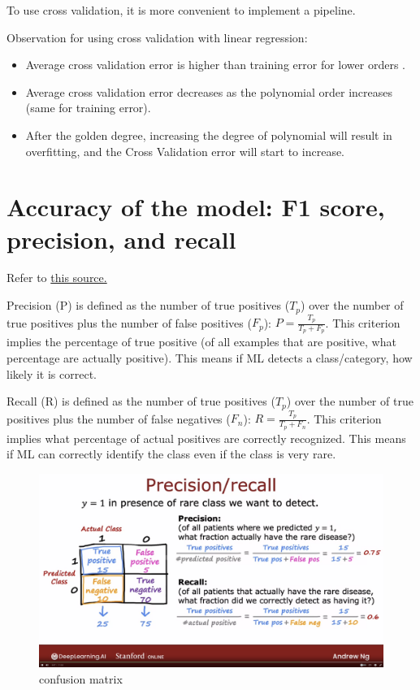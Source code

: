 \documentclass[12pt]{report}
\begin{document}
To use cross validation, it is more convenient to implement a pipeline.

Observation for using cross validation with linear regression:
\begin{itemize}
  \item Average cross validation error is higher than training error for lower orders .
  \item Average cross validation error decreases as the polynomial order increases (same for training error).
  \item After the golden degree, increasing the degree of polynomial will result in overfitting, and the Cross Validation error will start to increase.
\end{itemize}

\section{Accuracy of the model: F1 score, precision, and recall}
Refer to \href{https://scikit-learn.org/stable/auto_examples/model_selection/plot_precision_recall.html#precision-recall}{this source.}

Precision (P) is defined as the number of true positives ($T_p$) over the number of true positives plus the number of false positives ($F_p$): $P = \frac{T_p}{T_p + F_p} $. This criterion implies the percentage of true positive (of all examples that are positive, what percentage are actually positive). This means if ML detects a class/category, how likely it is correct.

Recall (R) is defined as the number of true positives ($T_p$) over the number of true positives plus the number of false negatives ($F_n$): $R = \frac{T_p}{T_p + F_n} $. This criterion implies what percentage of actual positives are correctly recognized. This means if ML can correctly identify the class even if the class is very rare.


\begin{figure}[H]
  \centering
  \includegraphics[trim =0.0cm 0.0cm 0.0cm 0.0cm, clip, scale=0.15]{pics/confusionMatrix.png}
  \caption{confusion matrix}
\end{figure}
\end{document}
